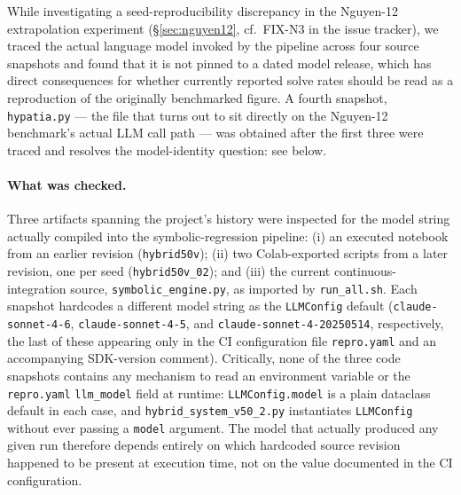 \documentclass[11pt]{article}
\begin{document}
While investigating a seed-reproducibility discrepancy in the Nguyen-12
extrapolation experiment (\S\ref{sec:nguyen12}, cf.\ FIX-N3 in the issue
tracker), we traced the actual language model invoked by the pipeline
across four source snapshots and found that it is not pinned to a dated
model release, which has direct consequences for whether currently
reported solve rates should be read as a reproduction of the originally
benchmarked figure. A fourth snapshot, \texttt{hypatia.py} --- the file
that turns out to sit directly on the Nguyen-12 benchmark's actual LLM
call path --- was obtained after the first three were traced and
resolves the model-identity question: see below.

\paragraph{What was checked.} Three artifacts spanning the project's
history were inspected for the model string actually compiled into the
symbolic-regression pipeline: (i) an executed notebook from an earlier
revision (\texttt{hybrid50v}); (ii) two Colab-exported scripts from a later
revision, one per seed (\texttt{hybrid50v\_02}); and (iii) the current
continuous-integration source, \texttt{symbolic\_engine.py}, as imported by
\texttt{run\_all.sh}. Each snapshot hardcodes a different model string as
the \texttt{LLMConfig} default (\texttt{claude-sonnet-4-6},
\texttt{claude-sonnet-4-5}, and \texttt{claude-sonnet-4-20250514},
respectively, the last of these appearing only in the CI configuration file
\texttt{repro.yaml} and an accompanying SDK-version comment). Critically,
none of the three code snapshots contains any mechanism to read an
environment variable or the \texttt{repro.yaml} \texttt{llm\_model} field at
runtime: \texttt{LLMConfig.model} is a plain dataclass default in each case,
and \texttt{hybrid\_system\_v50\_2.py} instantiates \texttt{LLMConfig}
without ever passing a \texttt{model} argument. The model that actually
produced any given run therefore depends entirely on which hardcoded source
revision happened to be present at execution time, not on the value
documented in the CI configuration.
\end{document}
